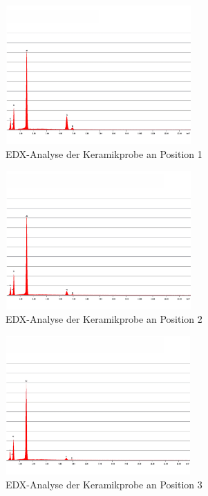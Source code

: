 \documentclass[12pt,english,ngerman]{scrartcl}
\begin{document}
\begin{figure}[H]
	\begin{center}
		\includegraphics[width =\textwidth,height=5.3cm]{./figures/edx1.png}
	\end{center}
	\caption{EDX-Analyse der Keramikprobe an Position 1~\cite{zankel_serie_nodate}
	}\label{fig:position1}
\end{figure}
\begin{figure}[H]
	\begin{center}
		\includegraphics[width =\textwidth,height=5.3cm]{./figures/edx2.png}
	\end{center}
	\caption{EDX-Analyse der Keramikprobe an Position 2~\cite{zankel_serie_nodate}
	}\label{fig:position2}
\end{figure}
\begin{figure}[H]
	\begin{center}
		\includegraphics[width =\textwidth,height=5.3cm]{./figures/edx3.png}
	\end{center}
	\caption{EDX-Analyse der Keramikprobe an Position 3~\cite{zankel_serie_nodate}
	}\label{fig:position3}
\end{figure}
\end{document}
